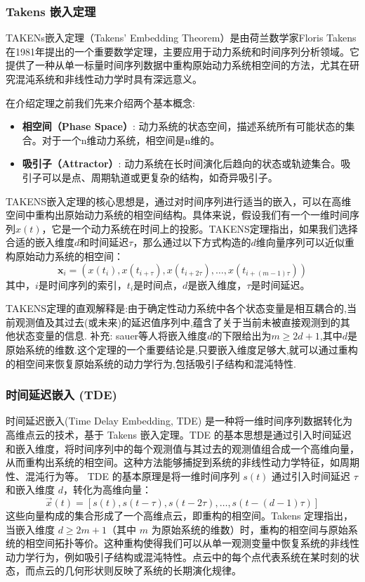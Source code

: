 \subsubsection{Takens 嵌入定理}
TAKENs嵌入定理（Takens' Embedding Theorem）\cite{takens2006detecting}是由荷兰数学家Floris Takens在1981年提出的一个重要数学定理，主要应用于动力系统和时间序列分析领域。它提供了一种从单一标量时间序列数据中重构原始动力系统相空间的方法，尤其在研究混沌系统和非线性动力学时具有深远意义。

在介绍定理之前我们先来介绍两个基本概念:
\begin{itemize}
    \item \textbf{相空间（Phase Space）}: 动力系统的状态空间，描述系统所有可能状态的集合。对于一个n维动力系统，相空间是n维的。
    \item \textbf{吸引子（Attractor）}: 动力系统在长时间演化后趋向的状态或轨迹集合。吸引子可以是点、周期轨道或更复杂的结构，如奇异吸引子。
\end{itemize}
TAKENS嵌入定理的核心思想是，通过对时间序列进行适当的嵌入，可以在高维空间中重构出原始动力系统的相空间结构。具体来说，假设我们有一个一维时间序列$x(t)$，它是一个动力系统在时间上的投影。TAKENS定理指出，如果我们选择合适的嵌入维度$d$和时间延迟$\tau$，那么通过以下方式构造的$d$维向量序列可以近似重构原始动力系统的相空间：
\begin{equation}
    \mathbf{x}_i = (x(t_i), x(t_{i+\tau}), x(t_{i+2\tau}), \ldots, x(t_{i+(m-1)\tau}))
\end{equation}
其中，$i$是时间序列的索引，$t_i$是时间点，$d$是嵌入维度，$\tau$是时间延迟。

TAKENS定理的直观解释是:由于确定性动力系统中各个状态变量是相互耦合的,当前观测值及其过去(或未来)的延迟值序列中,蕴含了关于当前未被直接观测到的其他状态变量的信息.
补充: sauer等人将嵌入维度$d$的下限给出为$m\geq 2d+1$,其中$d$是原始系统的维数.这个定理的一个重要结论是,只要嵌入维度足够大,就可以通过重构的相空间来恢复原始系统的动力学行为,包括吸引子结构和混沌特性.



\subsubsection{时间延迟嵌入 (TDE)}
时间延迟嵌入(Time Delay Embedding, TDE) 是一种将一维时间序列数据转化为高维点云的技术，基于 Takens 嵌入定理。TDE 的基本思想是通过引入时间延迟和嵌入维度，将时间序列中的每个观测值与其过去的观测值组合成一个高维向量，从而重构出系统的相空间。这种方法能够捕捉到系统的非线性动力学特征，如周期性、混沌行为等。
TDE 的基本原理是将一维时间序列 \( s(t) \) 通过引入时间延迟 \( \tau \) 和嵌入维度 \( d \)，转化为高维向量：
\begin{equation}
    \vec{x}(t) = \left[ s(t), s(t - \tau), s(t - 2\tau), \dots, s(t - (d - 1)\tau) \right]
\end{equation}
这些向量构成的集合形成了一个高维点云，即重构的相空间。Takens 定理指出，当嵌入维度 \( d \geq 2m + 1 \)（其中 \( m \) 为原始系统的维数）时，重构的相空间与原始系统的相空间拓扑等价。这种重构使得我们可以从单一观测变量中恢复系统的非线性动力学行为，例如吸引子结构或混沌特性。点云中的每个点代表系统在某时刻的状态，而点云的几何形状则反映了系统的长期演化规律。


